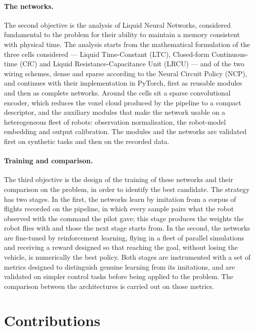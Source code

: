 \paragraph{The networks.}
The second objective is the analysis of Liquid Neural Networks, considered
fundamental to the problem for their ability to maintain a memory consistent
with physical time. The analysis starts from the mathematical formulation of
the three cells considered --- Liquid Time-Constant (LTC), Closed-form
Continuous-time (CfC) and Liquid Resistance-Capacitance Unit (LRCU) --- and of
the two wiring schemes, dense and sparse according to the Neural Circuit Policy
(NCP), and continues with their implementation in PyTorch, first as reusable
modules and then as complete networks. Around the cells sit a sparse
convolutional encoder, which reduces the voxel cloud produced by the pipeline
to a compact descriptor, and the auxiliary modules that make the network usable
on a heterogeneous fleet of robots: observation normalisation, the robot-model
embedding and output calibration. The modules and the networks are validated
first on synthetic tasks and then on the recorded data.

\paragraph{Training and comparison.}
The third objective is the design of the training of these networks and their
comparison on the problem, in order to identify the best candidate. The strategy
has two stages. In the first, the networks learn by imitation from a corpus of
flights recorded on the pipeline, in which every sample pairs what the robot
observed with the command the pilot gave; this stage produces the weights the
robot flies with and those the next stage starts from. In the second, the
networks are fine-tuned by reinforcement learning, flying in a fleet of parallel
simulations and receiving a reward designed so that reaching the goal, without
losing the vehicle, is numerically the best policy. Both stages are instrumented
with a set of metrics designed to distinguish genuine learning from its
imitations, and are validated on simpler control tasks before being applied to
the problem. The comparison between the architectures is carried out on those
metrics.

\section{Contributions}

